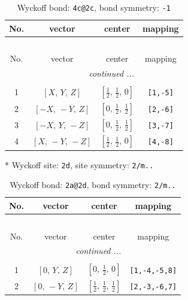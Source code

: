 \documentclass[fleqn,8pt]{jsarticle}
\begin{document}
\begin{longtable}{cccc}
\caption{Wyckoff bond: {\tt 4c@2c}, bond symmetry: {\tt -1}}
 \\
 \hline \hline
No. & vector & center & mapping \\ \hline \endfirsthead

\multicolumn{3}{l}{\tablename\ \thetable{}} \\
 \hline \hline
No. & vector & center & mapping \\ \hline \endhead

 \hline \hline
\multicolumn{3}{r}{\footnotesize\it continued ...} \\ \endfoot

 \hline \hline
\multicolumn{3}{r}{} \\ \endlastfoot

1 & $\left[ X,\, Y,\, Z \right]$ & $\left[ \frac{1}{2},\, \frac{1}{2},\, 0 \right]$ & {\tt [1,-5]} \\ \hline
2 & $\left[ - X,\, - Y,\, Z \right]$ & $\left[ 0,\, \frac{1}{2},\, \frac{1}{2} \right]$ & {\tt [2,-6]} \\ \hline
3 & $\left[ - X,\, Y,\, - Z \right]$ & $\left[ 0,\, \frac{1}{2},\, \frac{1}{2} \right]$ & {\tt [3,-7]} \\ \hline
4 & $\left[ X,\, - Y,\, - Z \right]$ & $\left[ \frac{1}{2},\, \frac{1}{2},\, 0 \right]$ & {\tt [4,-8]} \\
\end{longtable}
* Wyckoff site: {\tt 2d}, site symmetry: {\tt 2/m..}
\renewcommand{\arraystretch}{1.2}
\begin{longtable}{cccc}
\caption{Wyckoff bond: {\tt 2a@2d}, bond symmetry: {\tt 2/m..}}
 \\
 \hline \hline
No. & vector & center & mapping \\ \hline \endfirsthead

\multicolumn{3}{l}{\tablename\ \thetable{}} \\
 \hline \hline
No. & vector & center & mapping \\ \hline \endhead

 \hline \hline
\multicolumn{3}{r}{\footnotesize\it continued ...} \\ \endfoot

 \hline \hline
\multicolumn{3}{r}{} \\ \endlastfoot

1 & $\left[ 0,\, Y,\, Z \right]$ & $\left[ 0,\, \frac{1}{2},\, 0 \right]$ & {\tt [1,-4,-5,8]} \\ \hline
2 & $\left[ 0,\, - Y,\, Z \right]$ & $\left[ \frac{1}{2},\, \frac{1}{2},\, \frac{1}{2} \right]$ & {\tt [2,-3,-6,7]} \\
\end{longtable}
\end{document}
